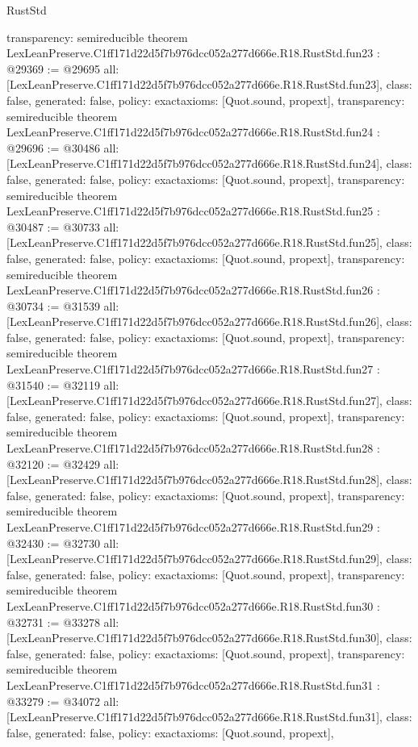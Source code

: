 \begin{lexlean}{RustStd}
\begin{coremodule}
{  transparency: semireducible
}
theorem LexLeanPreserve.C1ff171d22d5f7b976dcc052a277d666e.R18.RustStd.fun23 : @29369 := @29695 {
  all: [LexLeanPreserve.C1ff171d22d5f7b976dcc052a277d666e.R18.RustStd.fun23],
  class: false,
  generated: false,
  policy: exact{axioms: [Quot.sound, propext]},
  transparency: semireducible
}
theorem LexLeanPreserve.C1ff171d22d5f7b976dcc052a277d666e.R18.RustStd.fun24 : @29696 := @30486 {
  all: [LexLeanPreserve.C1ff171d22d5f7b976dcc052a277d666e.R18.RustStd.fun24],
  class: false,
  generated: false,
  policy: exact{axioms: [Quot.sound, propext]},
  transparency: semireducible
}
theorem LexLeanPreserve.C1ff171d22d5f7b976dcc052a277d666e.R18.RustStd.fun25 : @30487 := @30733 {
  all: [LexLeanPreserve.C1ff171d22d5f7b976dcc052a277d666e.R18.RustStd.fun25],
  class: false,
  generated: false,
  policy: exact{axioms: [Quot.sound, propext]},
  transparency: semireducible
}
theorem LexLeanPreserve.C1ff171d22d5f7b976dcc052a277d666e.R18.RustStd.fun26 : @30734 := @31539 {
  all: [LexLeanPreserve.C1ff171d22d5f7b976dcc052a277d666e.R18.RustStd.fun26],
  class: false,
  generated: false,
  policy: exact{axioms: [Quot.sound, propext]},
  transparency: semireducible
}
theorem LexLeanPreserve.C1ff171d22d5f7b976dcc052a277d666e.R18.RustStd.fun27 : @31540 := @32119 {
  all: [LexLeanPreserve.C1ff171d22d5f7b976dcc052a277d666e.R18.RustStd.fun27],
  class: false,
  generated: false,
  policy: exact{axioms: [Quot.sound, propext]},
  transparency: semireducible
}
theorem LexLeanPreserve.C1ff171d22d5f7b976dcc052a277d666e.R18.RustStd.fun28 : @32120 := @32429 {
  all: [LexLeanPreserve.C1ff171d22d5f7b976dcc052a277d666e.R18.RustStd.fun28],
  class: false,
  generated: false,
  policy: exact{axioms: [Quot.sound, propext]},
  transparency: semireducible
}
theorem LexLeanPreserve.C1ff171d22d5f7b976dcc052a277d666e.R18.RustStd.fun29 : @32430 := @32730 {
  all: [LexLeanPreserve.C1ff171d22d5f7b976dcc052a277d666e.R18.RustStd.fun29],
  class: false,
  generated: false,
  policy: exact{axioms: [Quot.sound, propext]},
  transparency: semireducible
}
theorem LexLeanPreserve.C1ff171d22d5f7b976dcc052a277d666e.R18.RustStd.fun30 : @32731 := @33278 {
  all: [LexLeanPreserve.C1ff171d22d5f7b976dcc052a277d666e.R18.RustStd.fun30],
  class: false,
  generated: false,
  policy: exact{axioms: [Quot.sound, propext]},
  transparency: semireducible
}
theorem LexLeanPreserve.C1ff171d22d5f7b976dcc052a277d666e.R18.RustStd.fun31 : @33279 := @34072 {
  all: [LexLeanPreserve.C1ff171d22d5f7b976dcc052a277d666e.R18.RustStd.fun31],
  class: false,
  generated: false,
  policy: exact{axioms: [Quot.sound, propext]},
}
\end{coremodule}
\end{lexlean}
